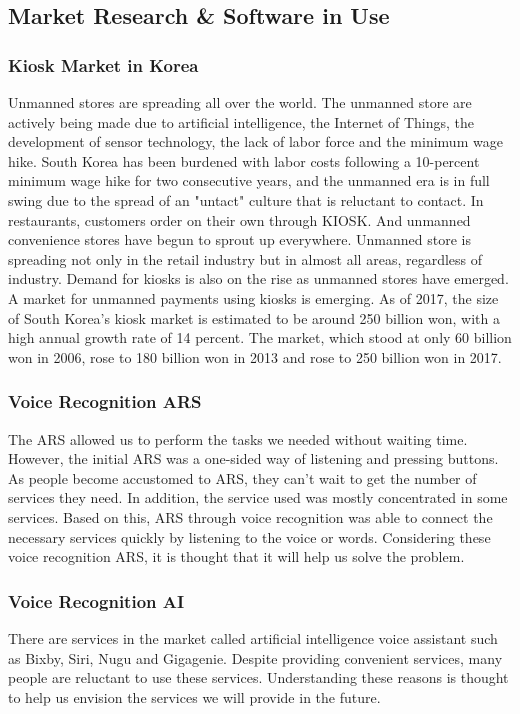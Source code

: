 \documentclass[conference,compsoc]{IEEEtran}
\begin{document}
\subsection{Market Research \& Software in Use}

\subsubsection{Kiosk Market in Korea}
Unmanned stores are spreading all over the world. The unmanned store are actively being made due to artificial intelligence, the Internet of Things, the development of sensor technology, the lack of labor force and the minimum wage hike. South Korea has been burdened with labor costs following a 10-percent minimum wage hike for two consecutive years, and the unmanned era is in full swing due to the spread of an "untact" culture that is reluctant to contact. In restaurants, customers order on their own through KIOSK. And unmanned convenience stores have begun to sprout up everywhere. Unmanned store is spreading not only in the retail industry but in almost all areas, regardless of industry. Demand for kiosks is also on the rise as unmanned stores have emerged. A market for unmanned payments using kiosks is emerging. As of 2017, the size of South Korea's kiosk market is estimated to be around 250 billion won, with a high annual growth rate of 14 percent. The market, which stood at only 60 billion won in 2006, rose to 180 billion won in 2013 and rose to 250 billion won in 2017.

\subsubsection{Voice Recognition ARS}
The ARS allowed us to perform the tasks we needed without waiting time. However, the initial ARS was a one-sided way of listening and pressing buttons. As people become accustomed to ARS, they can't wait to get the number of services they need. In addition, the service used was mostly concentrated in some services. Based on this, ARS through voice recognition was able to connect the necessary services quickly by listening to the voice or words. Considering these voice recognition ARS, it is thought that it will help us solve the problem.

\subsubsection{Voice Recognition AI}
There are services in the market called artificial intelligence voice assistant such as Bixby, Siri, Nugu and Gigagenie. Despite providing convenient services, many people are reluctant to use these services. Understanding these reasons is thought to help us envision the services we will provide in the future.
\end{document}
